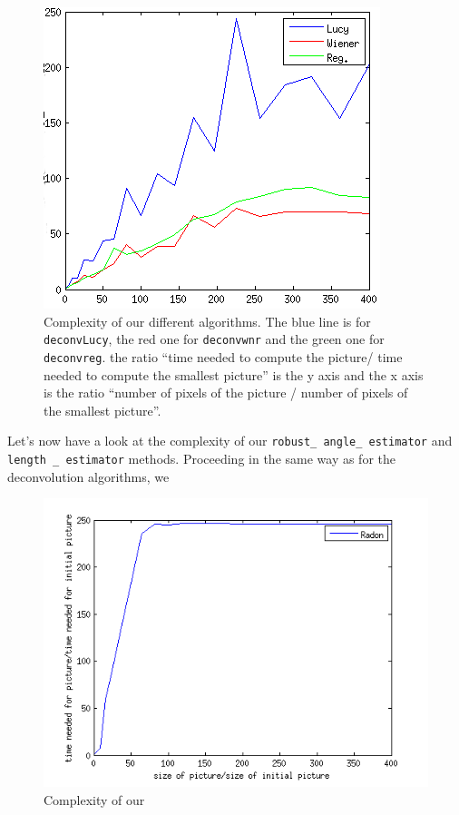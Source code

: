 \begin{figure}[h!]
\centering
\includegraphics[scale=0.7]{../Images/Complexity.png}
\caption{Complexity of our different algorithms. The blue line is for \texttt{deconvLucy}, the red one for \texttt{deconvwnr} and the green one for \texttt{deconvreg}. the ratio ``time needed to compute the picture/ time needed to compute the smallest picture'' is the y axis and the x axis is the ratio ``number of pixels of the picture / number of pixels of the smallest picture''.}
\label{fig:Complexity}
\end{figure}


Let's now have a look at the complexity of our \texttt{robust\_ angle\_ estimator} and \texttt{length \_ estimator} methods. Proceeding in the same way as for the deconvolution algorithms, we 


\begin{figure}[h!]
\centering
\includegraphics[scale=0.7]{../Images/ComplexityRadon.png}
\caption{Complexity of our }
\label{fig:ComplexityRadon}
\end{figure}

